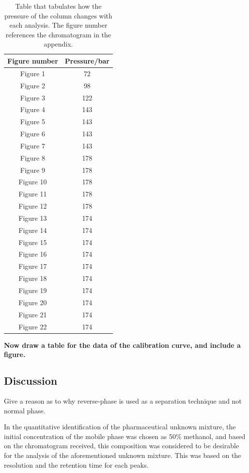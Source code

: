 \documentclass[a4paper, 12pt]{article}
\begin{document}
\begin{table}[h!]
	\centering
	\caption{Table that tabulates how the pressure of the column changes with each analysis. The figure number references the chromatogram in the appendix.}
	\begin{tabular}{|c|c|}
		\hline
		Figure number & Pressure/bar\\
		\hline
		Figure 1  & 72 \\ 
		\hline
		Figure 2 & 98 \\
		\hline
		Figure 3 & 122 \\
		\hline
		Figure 4 & 143 \\
		\hline
		Figure 5 & 143 \\
		\hline
		Figure 6 & 143 \\
		\hline
		Figure 7 & 143 \\
		\hline
		Figure 8 & 178 \\
		\hline
		Figure 9 & 178 \\
		\hline
		Figure 10 & 178 \\
		\hline
		Figure 11 & 178 \\
		\hline
		Figure 12 & 178 \\
		\hline
		Figure 13 & 174 \\
		\hline
		Figure 14 & 174 \\
		\hline
		Figure 15 & 174 \\
		\hline
		Figure 16 & 174 \\
		\hline
		Figure 17 & 174 \\
		\hline
		Figure 18 & 174 \\
		\hline
		Figure 19 & 174 \\
		\hline
		Figure 20 & 174 \\
		\hline
		Figure 21 & 174 \\
		\hline
		Figure 22 & 174 \\ 
		\hline
	\end{tabular}
	\label{tab-pressure}
\end{table}

\textbf{Now draw a table for the data of the calibration curve, and include a figure.}

\subsection{Discussion}
Give a reason as to why reverse-phase is used as a separation technique and not normal phase.

In the quantitative identification of the pharmaceutical unknown mixture, the initial concentration of the mobile phase was chosen as 50\% methanol, and based on the chromatogram received, this composition was considered to be desirable for the analysis of the aforementioned unknown mixture. This was based on the resolution and the retention time for each peaks.
\end{document}

